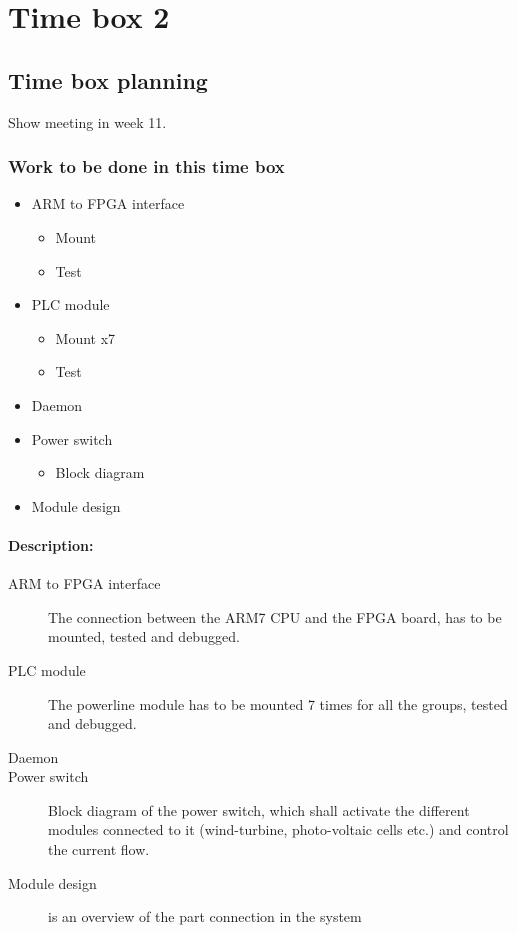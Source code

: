 \section{Time box 2}
\subsection{Time box planning}
Show meeting in week 11.
\subsubsection{Work to be done in this time box}
\begin{itemize}
	\item ARM to FPGA interface
	\begin{itemize}
		\item Mount
		\item Test
	\end{itemize}
	\item PLC module
	\begin{itemize}
		\item Mount x7
		\item Test
	\end{itemize}
	\item Daemon
	\item Power switch
	\begin{itemize}
		\item Block diagram
	\end{itemize}
	\item Module design
\end{itemize}
\paragraph{Description:}
\begin{description}
	\item[ARM to FPGA interface] The connection between the ARM7 CPU and the FPGA board, has to be mounted, tested and debugged.
	\item[PLC module] The powerline module has to be mounted 7 times for all the groups, tested and debugged.
	\item[Daemon] 
	\item[Power switch] Block diagram of the power switch, which shall activate the different modules connected to it (wind-turbine, photo-voltaic cells etc.) and control the current flow.
	\item[Module design] is an overview of the part connection in the system
\end{description}

